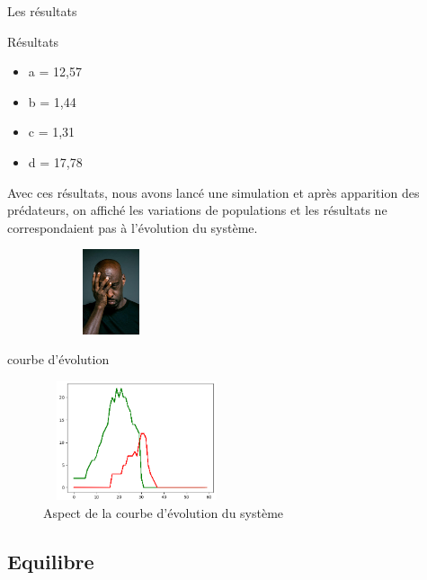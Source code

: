 \documentclass{beamer}
\begin{document}
\begin{frame}{Les résultats}
    \begin{exampleblock}{Résultats}
        \begin{itemize}
            \item a = 12,57
            \item b = 1,44
            \item c = 1,31
            \item d = 17,78
	    \end{itemize}
    \end{exampleblock}
    
    Avec ces résultats, nous avons lancé une simulation et après apparition des prédateurs, on affiché les variations de populations et les résultats ne correspondaient pas à l'évolution du système.
    
    \begin{figure}[h] \pause
        \centering
        \includegraphics[width=4cm, height=2.5cm]{images/deception.jpg} 
    \end{figure}
    
\end{frame}

\begin{frame}{courbe d'évolution}
    \begin{figure}[h]
        \centering
    \includegraphics[width=5.5cm, height=3.5cm]{images/non_eq.png}
    \caption{Aspect de la courbe d'évolution du système}
    \end{figure}
\end{frame}

\subsection{Equilibre}
\end{document}
